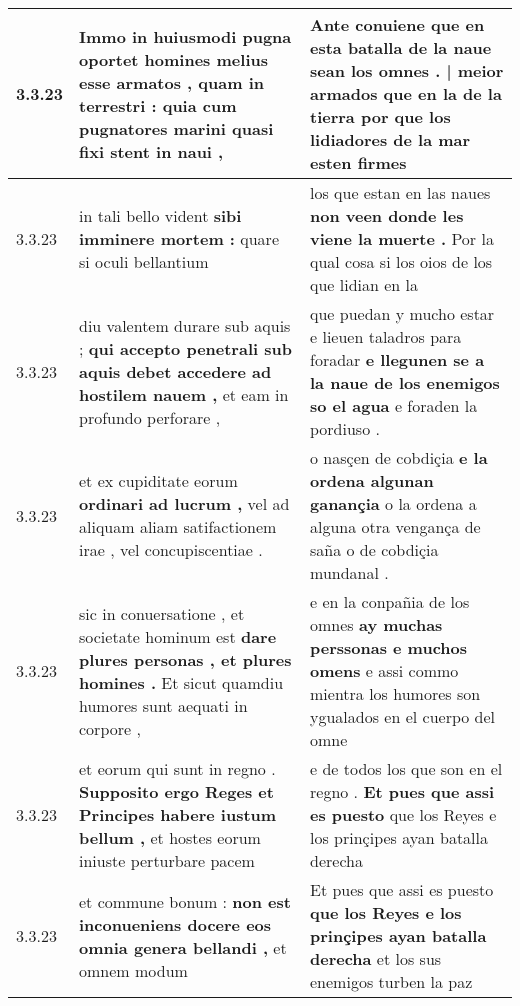\begin{tabular}{|p{1cm}|p{6.5cm}|p{6.5cm}|}
3.3.23 & Immo in huiusmodi pugna oportet \textbf{ homines melius esse armatos , quam in terrestri : } quia cum pugnatores marini quasi fixi stent in naui , & Ante conuiene que en esta batalla de la \textbf{ naue sean los omnes . | meior armados que en la de la tierra } por que los lidiadores de la mar esten firmes \\\hline
3.3.23 & in tali bello vident \textbf{ sibi imminere mortem : } quare si oculi bellantium & los que estan en las naues \textbf{ non veen donde les viene la muerte . } Por la qual cosa si los oios de los que lidian en la \\\hline
3.3.23 & diu valentem durare sub aquis ; \textbf{ qui accepto penetrali sub aquis debet accedere ad hostilem nauem , } et eam in profundo perforare , & que puedan y mucho estar e lieuen taladros para foradar \textbf{ e llegunen se a la naue de los enemigos so el agua } e foraden la pordiuso . \\\hline
3.3.23 & et ex cupiditate eorum \textbf{ ordinari ad lucrum , } vel ad aliquam aliam satifactionem irae , vel concupiscentiae . & o nasçen de cobdiçia \textbf{ e la ordena algunan ganançia } o la ordena a alguna otra vengança de saña o de cobdiçia mundanal . \\\hline
3.3.23 & sic in conuersatione , et societate hominum est \textbf{ dare plures personas , et plures homines . } Et sicut quamdiu humores sunt aequati in corpore , & e en la conpañia de los omnes \textbf{ ay muchas perssonas e muchos omens } e assi commo mientra los humores son ygualados en el cuerpo del omne \\\hline
3.3.23 & et eorum qui sunt in regno . \textbf{ Supposito ergo Reges et Principes habere iustum bellum , } et hostes eorum iniuste perturbare pacem & e de todos los que son en el regno . \textbf{ Et pues que assi es puesto } que los Reyes e los prinçipes ayan batalla derecha \\\hline
3.3.23 & et commune bonum : \textbf{ non est inconueniens docere eos omnia genera bellandi , } et omnem modum & Et pues que assi es puesto \textbf{ que los Reyes e los prinçipes ayan batalla derecha } et los sus enemigos turben la paz \\\hline

\end{tabular}
